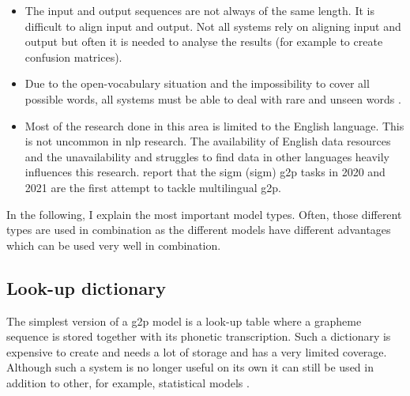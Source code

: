 \begin{itemize}
\item The input and output sequences are not always of the same length. It is difficult to align input and output. Not all systems rely on aligning input and output but often it is needed to analyse the results (for example to create confusion matrices). 
\item Due to the open-vocabulary situation and the impossibility to cover all possible words, all systems must be able to deal with rare and unseen words \citep{Rao2015GraphemetophonemeCU, ney-joint-sequence2008}. 
\item Most of the research done in this area is limited to the English language. This is not uncommon in \ac{nlp} research. The availability of English data resources and the unavailability and struggles to find data in other languages heavily influences this research. \citet{Ashby&Bartley.2021} report that the \acs{sigm} (\acl{sigm}) \ac{g2p} tasks in 2020 and 2021 are the first attempt to tackle multilingual \ac{g2p}.
\end{itemize}

In the following, I explain the most important model types. Often, those different types are used in combination as the different models have different advantages which can be used very well in combination. 

\subsection{Look-up dictionary} The simplest version of a \ac{g2p} model is a look-up table where a grapheme sequence is stored together with its phonetic transcription. Such a dictionary is expensive to create and needs a lot of storage and has a very limited coverage. Although such a system is no longer useful on its own it can still be used in addition to other, for example, statistical models \citep{ney-joint-sequence2008}.

